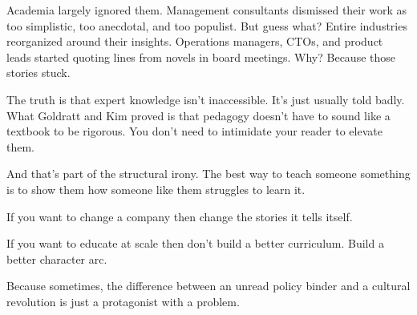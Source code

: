 \medskip

Academia largely ignored them. Management consultants dismissed their work as too simplistic, too anecdotal, and too populist.
But guess what?
Entire industries reorganized around their insights.
Operations managers, CTOs, and product leads started quoting lines from novels in board meetings.
Why? Because those stories stuck.

The truth is that expert knowledge isn’t inaccessible.
It’s just usually told badly.
What Goldratt and Kim proved is that pedagogy doesn’t have to sound like a textbook to be rigorous.
You don’t need to intimidate your reader to elevate them.

And that’s part of the structural irony.
The best way to teach someone something is to show them how someone like them struggles to learn it.

If you want to change a company then change the stories it tells itself.

If you want to educate at scale then don’t build a better curriculum. Build a better character arc.

Because sometimes, the difference between an unread policy binder and a cultural revolution is just a protagonist with a problem.